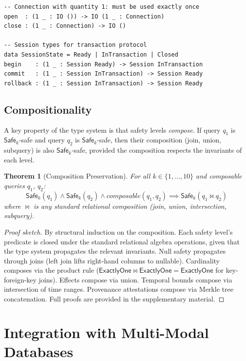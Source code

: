 \documentclass[11pt,a4paper]{article}
\newtheorem{theorem}{Theorem}[section]
\newcommand{\Safe}[1]{\ensuremath{\mathsf{Safe}_{#1}}}
\begin{document}
\begin{lstlisting}[language=Idris2]
-- Connection with quantity 1: must be used exactly once
open  : (1 _ : IO ()) -> IO (1 _ : Connection)
close : (1 _ : Connection) -> IO ()

-- Session types for transaction protocol
data SessionState = Ready | InTransaction | Closed
begin    : (1 _ : Session Ready) -> Session InTransaction
commit   : (1 _ : Session InTransaction) -> Session Ready
rollback : (1 _ : Session InTransaction) -> Session Ready
\end{lstlisting}

\subsection{Compositionality}

A key property of the type system is that safety levels \emph{compose}.
If query $q_1$ is \Safe{k}-safe and query $q_2$ is \Safe{k}-safe,
then their composition (join, union, subquery) is also \Safe{k}-safe,
provided the composition respects the invariants of each level.

\begin{theorem}[Composition Preservation]
For all $k \in \{1, \ldots, 10\}$ and composable queries $q_1$, $q_2$:
\[
  \Safe{k}(q_1) \land \Safe{k}(q_2) \land \mathit{composable}(q_1, q_2)
  \implies \Safe{k}(q_1 \bowtie q_2)
\]
where $\bowtie$ is any standard relational composition (join, union,
intersection, subquery).
\end{theorem}

\begin{proof}[Proof sketch]
By structural induction on the composition.  Each safety level's
predicate is closed under the standard relational algebra operations,
given that the type system propagates the relevant invariants.
Null safety propagates through joins (left join lifts right-hand
columns to nullable).  Cardinality composes via the product rule
($\mathsf{ExactlyOne} \bowtie \mathsf{ExactlyOne} = \mathsf{ExactlyOne}$
for key-foreign-key joins).  Effects compose via union.
Temporal bounds compose via intersection of time ranges.
Provenance attestations compose via Merkle tree concatenation.
Full proofs are provided in the supplementary material.
\end{proof}

\section{Integration with Multi-Modal Databases}\label{sec:multimodal}
\end{document}
